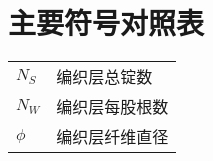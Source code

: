 
\chapter{主要符号对照表}
\label{chap:symb}
\newcommand{\ha}{Hachemi}
\newcommand{\hacite}{Hachemi\footnote{Hachemi H, Kebir H, Roelandt J M, et al. A study of the braided corrugated hoses: Behavior and life estimation[J]. Materials \& Design, 2011, 32(4): 1957-1966.}}
\newcommand{\aba}{ABAQUS}
\newcommand{\uma}{UMAT}
\begin{center}
	

\vspace{1cm}
\begin{tabular}{ll}
	$N_S$ \qquad & \hspace{5em}编织层总锭数 \\
	$N_W$ \qquad & \hspace{5em}编织层每股根数\\
	$ \phi $\qquad & \hspace{5em} 编织层纤维直径\\
\end{tabular}


\end{center}
